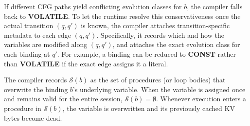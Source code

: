 If different CFG paths yield conflicting evolution classes for $b$, the compiler falls back to \textbf{VOLATILE}. To let the runtime resolve this conservativeness once the actual transition $(q, q')$ is known, the compiler attaches transition-specific metadata to each edge $(q, q')$. Specifically, it records which and how the variables are modified along $(q,q')$, and attaches the exact evolution class for each binding at $q'$. For example, a binding can be reduced to \textbf{CONST} rather than \textbf{VOLATILE} if the exact edge assigns it a literal.


The compiler records $\mathcal{S}(b)$ as the set of procedures (or loop bodies) that overwrite the binding $b$'s underlying variable. When the variable is assigned once and remains valid for the entire session, $\mathcal{S}(b)=\emptyset$. Whenever execution enters a procedure in $\mathcal{S}(b)$, the variable is overwritten and its previously cached KV bytes become dead.


